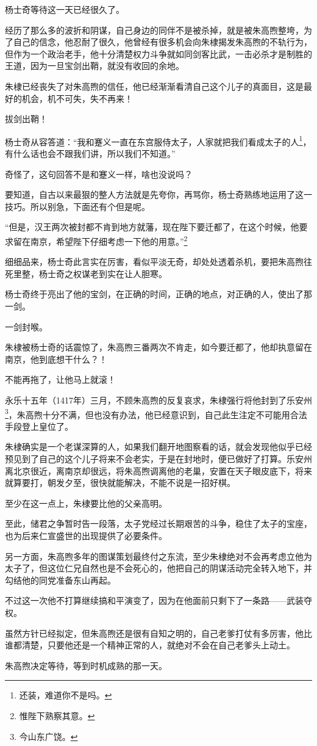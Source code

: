 \begin{multicols}{\theparacolNo}
杨士奇等待这一天已经很久了。

经历了那么多的波折和阴谋，自己身边的同伴不是被杀掉，就是被朱高煦整垮，为了自己的信念，他忍耐了很久，他曾经有很多机会向朱棣揭发朱高煦的不轨行为，但作为一个政治老手，他十分清楚权力斗争就如同剑客比武，一击必杀才是制胜的王道，因为一旦宝剑出鞘，就没有收回的余地。

朱棣已经丧失了对朱高煦的信任，他已经渐渐看清自己这个儿子的真面目，这是最好的机会，机不可失，失不再来！

拔剑出鞘！

杨士奇从容答道：“我和蹇义一直在东宫服侍太子，人家就把我们看成太子的人\footnote{还装，难道你不是吗。}，有什么话也会不跟我们讲，所以我们不知道。”

奇怪了，这句回答不是和蹇义一样，啥也没说吗？

要知道，自古以来最狠的整人方法就是先夸你，再骂你，杨士奇熟练地运用了这一技巧。所以别急，下面还有个但是呢。

“但是，汉王两次被封都不肯到地方就藩，现在陛下要迁都了，在这个时候，他要求留在南京，希望陛下仔细考虑一下他的用意。”\footnote{惟陛下熟察其意。}

细细品来，杨士奇此言实在厉害，看似平淡无奇，却处处透着杀机，要把朱高煦往死里整，杨士奇之权谋老到实在让人胆寒。

杨士奇终于亮出了他的宝剑，在正确的时间，正确的地点，对正确的人，使出了那一剑。

一剑封喉。

朱棣被杨士奇的话震惊了，朱高煦三番两次不肯走，如今要迁都了，他却执意留在南京，他到底想干什么？！

不能再拖了，让他马上就滚！

永乐十五年（1417年）三月，不顾朱高煦的反复哀求，朱棣强行将他封到了乐安州\footnote{今山东广饶。}，朱高煦十分不满，但也没有办法，他已经意识到，自己此生注定不可能用合法手段登上皇位了。

朱棣确实是一个老谋深算的人，如果我们翻开地图察看的话，就会发现他似乎已经预见到了自己的这个儿子将来不会老实，于是在封地时，便已做好了打算。乐安州离北京很近，离南京却很远，将朱高煦调离他的老巢，安置在天子眼皮底下，将来就算要打，朝发夕至，很快就能解决，不能不说是一招好棋。

至少在这一点上，朱棣要比他的父亲高明。

至此，储君之争暂时告一段落，太子党经过长期艰苦的斗争，稳住了太子的宝座，也为后来仁宣盛世的出现提供了必要条件。

另一方面，朱高煦多年的图谋策划最终付之东流，至少朱棣绝对不会再考虑立他为太子了，但这位仁兄自然也是不会死心的，他把自己的阴谋活动完全转入地下，并勾结他的同党准备东山再起。

不过这一次他不打算继续搞和平演变了，因为在他面前只剩下了一条路——武装夺权。

虽然方针已经拟定，但朱高煦还是很有自知之明的，自己老爹打仗有多厉害，他比谁都清楚，只要他还是一个精神正常的人，就绝对不会在自己老爹头上动土。

朱高煦决定等待，等到时机成熟的那一天。
\ifnum{}
	\end{multicols}
\fi
\newpage
